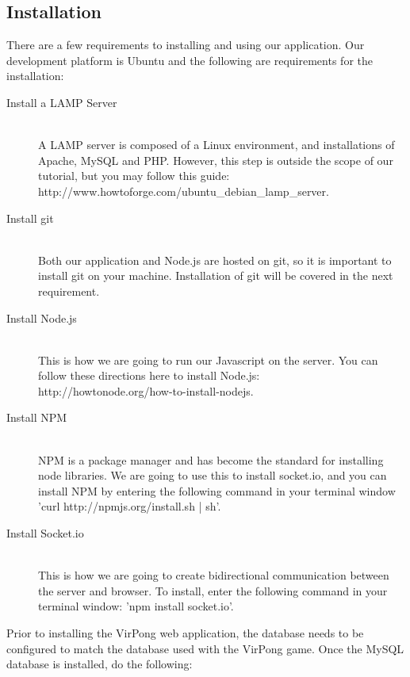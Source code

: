 %

	\subsection{Installation}
		There are a few requirements to installing and using our application. Our development platform is Ubuntu and the following are requirements for the installation:
		\begin{description}
			\item[Install a LAMP Server] \hfill \\
				A LAMP server is composed of a Linux environment, and installations of Apache, MySQL and PHP. However, this step is outside the scope of our tutorial, but you may follow this guide:\\http://www.howtoforge.com/ubuntu\_debian\_lamp\_server.
			\item[Install git] \hfill \\
				Both our application and Node.js are hosted on git, so it is important to install git on your machine. Installation of git will be covered in the next requirement.
			\item[Install Node.js] \hfill \\
				This is how we are going to run our Javascript on the server. You can follow these directions here to install Node.js:\\http://howtonode.org/how-to-install-nodejs.
			\item[Install NPM] \hfill \\
				NPM is a package manager and has become the standard for installing node libraries. We are going to use this to install socket.io, and you can install NPM by entering the following command in your terminal window 'curl http://npmjs.org/install.sh | sh'.
			\item[Install Socket.io] \hfill \\
				This is how we are going to create bidirectional communication between the server and browser. To install, enter the following command in your terminal window: 'npm install socket.io'.
		\end{description}
		Prior to installing the VirPong web application, the database needs to be configured to match the database used with the VirPong game. Once the MySQL database is installed, do the following:
